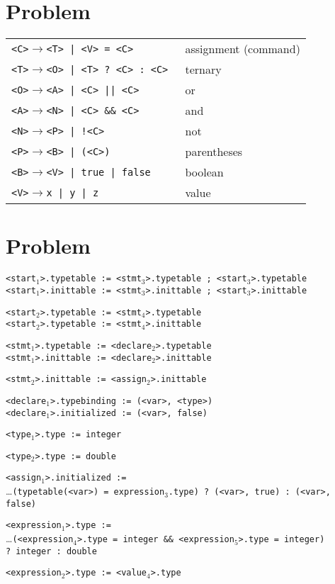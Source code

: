 \documentclass[letterpaper]{article}
\newcommand{\problem}{\section{Problem}}
\begin{document}
\problem{}
\begin{tabular}{l l}
    \texttt{<C>}\quad$\rightarrow$\quad\texttt{<T> | <V> = <C>} & assignment (command)\\
    \texttt{<T>}\quad$\rightarrow$\quad\texttt{<O> | <T> ? <C> : <C> } & ternary\\
    \texttt{<O>}\quad$\rightarrow$\quad\texttt{<A> | <C> || <C>} & or\\
    \texttt{<A>}\quad$\rightarrow$\quad\texttt{<N> | <C> \&\& <C>} & and\\
    \texttt{<N>}\quad$\rightarrow$\quad\texttt{<P> | !<C>} & not\\
    \texttt{<P>}\quad$\rightarrow$\quad\texttt{<B> | (<C>)} & parentheses\\
    \texttt{<B>}\quad$\rightarrow$\quad\texttt{<V> | true | false} & boolean\\
    \texttt{<V>}\quad$\rightarrow$\quad\texttt{x | y | z} & value
\end{tabular}

\problem{}
\texttt{<start$_1$>.typetable := <stmt$_3$>.typetable ; <start$_3$>.typetable}\\
\texttt{<start$_1$>.inittable := <stmt$_3$>.inittable ; <start$_3$>.inittable}

\texttt{<start$_2$>.typetable := <stmt$_4$>.typetable}\\
\texttt{<start$_2$>.typetable := <stmt$_4$>.inittable}

\texttt{<stmt$_1$>.typetable := <declare$_2$>.typetable}\\
\texttt{<stmt$_1$>.inittable := <declare$_2$>.inittable}

\texttt{<stmt$_2$>.inittable := <assign$_2$>.inittable}

\texttt{<declare$_1$>.typebinding := (<var>, <type>)}\\
\texttt{<declare$_1$>.initialized := (<var>, false)}

\texttt{<type$_1$>.type := integer}

\texttt{<type$_2$>.type := double}

\texttt{<assign$_1$>.initialized :=}\\ \ldots\quad \texttt{(typetable(<var>) = expression$_3$.type) ?\ (<var>, true) :\ (<var>, false)}

\texttt{<expression$_1$>.type :=}\\ \ldots\quad \texttt{(<expression$_4$>.type = integer \&\& <expression$_5$>.type = integer) ?\ integer :\ double}

\texttt{<expression$_2$>.type := <value$_4$>.type}
\end{document}
